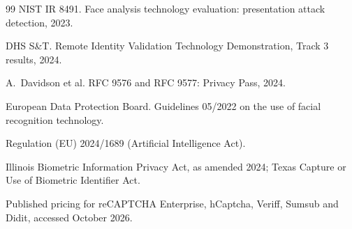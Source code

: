 \documentclass[11pt]{article}
\begin{document}
\begin{thebibliography}{99}
NIST IR 8491. Face analysis technology evaluation: presentation attack detection, 2023.

DHS S\&T. Remote Identity Validation Technology Demonstration, Track 3 results, 2024.

A.~Davidson et al. RFC 9576 and RFC 9577: Privacy Pass, 2024.

European Data Protection Board. Guidelines 05/2022 on the use of facial recognition technology.

Regulation (EU) 2024/1689 (Artificial Intelligence Act).

Illinois Biometric Information Privacy Act, as amended 2024; Texas Capture or Use of Biometric
Identifier Act.

Published pricing for reCAPTCHA Enterprise, hCaptcha, Veriff, Sumsub and Didit, accessed October 2026.

\end{thebibliography}
\end{document}
